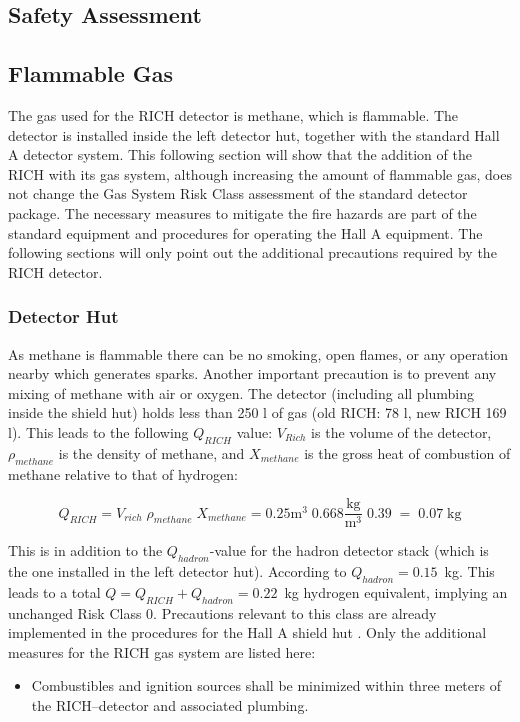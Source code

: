 \begin{safetyen}{0}{0}
\section{Safety Assessment}  

\subsection{Flammable Gas}
\label{sec:rich_hazard}
 
The gas used for the RICH detector 
is methane, which is flammable. The detector is installed inside
the left detector hut, together with the standard Hall A detector system.
This following section will show that the addition of the RICH with its gas system,
although increasing the amount of flammable gas, does not change the 
Gas System Risk Class assessment of the standard detector package. 
The necessary measures to mitigate the fire hazards are part of the standard
equipment and procedures for operating the Hall A equipment.
The following sections will only point out the additional precautions required by the RICH detector.

\subsubsection{Detector Hut}

As methane is flammable there can be no  
smoking, open flames, or any operation nearby which generates sparks.  
Another important precaution is to prevent any mixing of methane with air or 
oxygen.
The detector (including all plumbing inside the shield hut) holds less 
than 250 l of gas (old RICH: 78 l, new RICH 169 l). 
This leads to the following $Q_{RICH}$ value:  
$V_{Rich}$ is the  
volume of the detector, 
$\rho_{methane}$ is the density of methane, 
and $X_{methane}$ is the gross heat of combustion of methane relative 
to that of hydrogen: 
 
\begin{equation} 
Q_{RICH} = V_{rich} \; \rho_{methane} \; X_{methane} 
= 0.25 \mbox{m}^3 \; 0.668 \frac{\mbox{kg}}{\mbox{m}^3} \; 0.39 \; = \; 0.07 \; \mbox{kg}
\end{equation} 
 
This is in addition to the $Q_{hadron}$-value for the hadron detector stack (which is 
the one installed in the left detector hut). According to \cite{HazardCalc} $Q_{hadron}=0.15$~kg.
This leads to a total $Q = Q_{RICH} + Q_{hadron} = 0.22$~kg hydrogen equivalent, 
implying an unchanged Risk Class 0. Precautions relevant to this class are already 
implemented in the procedures for the Hall A shield hut \cite{Hawgswww}. Only the 
additional measures for the RICH gas system are listed here:
\begin{itemize}
\item Combustibles and ignition sources shall be minimized within three  
meters of the RICH--detector and associated plumbing. 


\end{itemize}
\end{safetyen}
